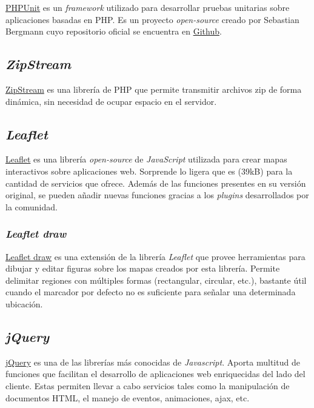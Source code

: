 \href{https://phpunit.de/}{PHPUnit} es un \emph{framework} utilizado
para desarrollar pruebas unitarias sobre aplicaciones basadas en PHP. Es
un proyecto \emph{open-source} creado por Sebastian Bergmann cuyo
repositorio oficial se encuentra en
\href{https://github.com/sebastianbergmann/phpunit}{Github}.

\subsection{\emph{ZipStream}}

\href{https://github.com/maennchen/ZipStream-PHP/tree/0.2.2}{ZipStream}
es una librería de PHP que permite transmitir archivos zip de forma
dinámica, sin necesidad de ocupar espacio en el servidor.

\subsection{\emph{Leaflet}}

\href{https://github.com/Leaflet/Leaflet}{Leaflet} es una librería
\emph{open-source} de \emph{JavaScript} utilizada para crear mapas
interactivos sobre aplicaciones web. Sorprende lo ligera que es (39kB)
para la cantidad de servicios que ofrece. Además de las funciones
presentes en su versión original, se pueden añadir nuevas funciones
gracias a los \emph{plugins} desarrollados por la comunidad.

\subsubsection{\emph{Leaflet draw}}

\href{https://github.com/Leaflet/Leaflet.draw}{Leaflet draw} es una
extensión de la librería \emph{Leaflet} que provee herramientas para
dibujar y editar figuras sobre los mapas creados por esta librería.
Permite delimitar regiones con múltiples formas (rectangular, circular,
etc.), bastante útil cuando el marcador por defecto no es suficiente
para señalar una determinada ubicación.

\subsection{\emph{jQuery}}

\href{https://jquery.com/}{jQuery} es una de las librerías más conocidas
de \emph{Javascript}. Aporta multitud de funciones que facilitan el
desarrollo de aplicaciones web enriquecidas del lado del cliente. Estas
permiten llevar a cabo servicios tales como la manipulación de
documentos HTML, el manejo de eventos, animaciones, ajax, etc.


